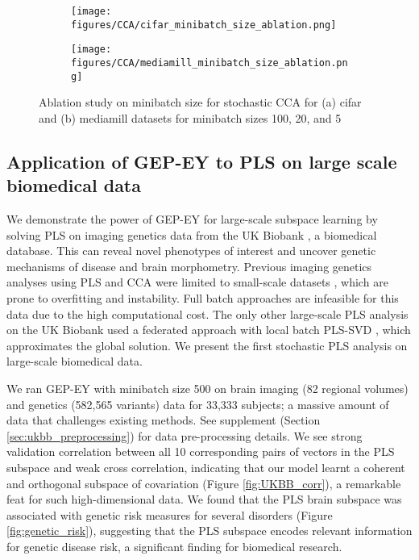 \begin{figure}[h]
\centering
     \begin{subfigure}[b]{0.49\textwidth}
         \centering
          \texttt{[image: figures/CCA/cifar\_minibatch\_size\_ablation.png]}
          \caption{}
          \label{fig:cifar_minibatch_ablation}
     \end{subfigure}
     \begin{subfigure}[b]{0.49\textwidth}
         \centering
          \texttt{[image: figures/CCA/mediamill\_minibatch\_size\_ablation.png]}
          \caption{}
          \label{fig:mediamill_minibatch_ablation}
     \end{subfigure}
\caption{Ablation study on minibatch size for stochastic CCA for (a) cifar and (b) mediamill datasets for minibatch sizes 100, 20, and 5}
\label{fig:minibatch size ablation}
\end{figure}

\subsection{Application of GEP-EY to PLS on large scale biomedical data}

We demonstrate the power of GEP-EY for large-scale subspace learning by solving PLS on imaging genetics data from the UK Biobank \cite{sudlow2015uk}, a biomedical database. This can reveal novel phenotypes of interest and uncover genetic mechanisms of disease and brain morphometry. Previous imaging genetics analyses using PLS and CCA were limited to small-scale datasets \cite{Lorenzi2018,Taquet2021,Lefloch2012}, which are prone to overfitting and instability. Full batch approaches are infeasible for this data due to the high computational cost. The only other large-scale PLS analysis on the UK Biobank used a federated approach with local batch PLS-SVD \cite{lorenzi2016}, which approximates the global solution. We present the first stochastic PLS analysis on large-scale biomedical data.

We ran GEP-EY with minibatch size 500 on brain imaging (82 regional volumes) and genetics (582,565 variants) data for 33,333 subjects; a massive amount of data that challenges existing methods. See supplement (Section \ref{sec:ukbb_preprocessing}) for data pre-processing details. We see strong validation correlation between all 10 corresponding pairs of vectors in the PLS subspace and weak cross correlation, indicating that our model learnt a coherent and orthogonal subspace of covariation (Figure \ref{fig:UKBB_corr}), a remarkable feat for such high-dimensional data. We found that the PLS brain subspace was associated with genetic risk measures for several disorders (Figure \ref{fig:genetic_risk}), suggesting that the PLS subspace encodes relevant information for genetic disease risk, a significant finding for biomedical research.


